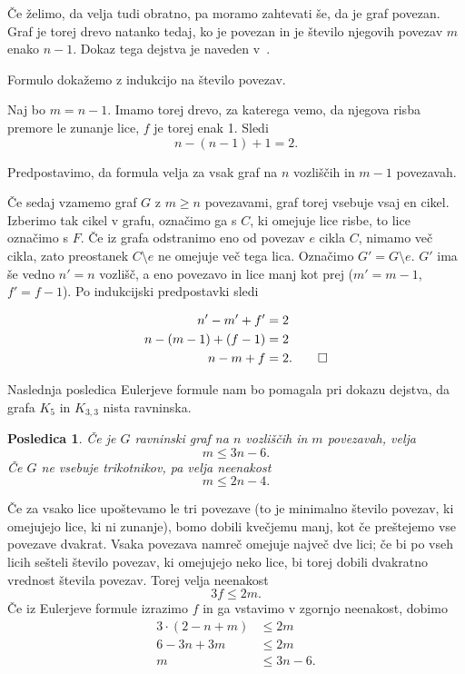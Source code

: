 \documentclass[12pt,a4paper]{amsart}
\theoremstyle{definition} %
\theoremstyle{plain} %
\newtheorem{posledica}[definicija]{Posledica}
\begin{document}
Če želimo, da velja tudi obratno, pa moramo zahtevati še, da je graf povezan. Graf je torej drevo natanko tedaj, ko je povezan in je število njegovih povezav $m$ enako $n-1$. Dokaz tega dejstva je naveden v~\cite[str.~57]{bib:potocnik}.

    Formulo dokažemo z indukcijo na število povezav.
    
    Naj bo $m = n-1$. Imamo torej drevo, za katerega vemo, da njegova risba premore le zunanje lice, $f$ je torej enak 1. Sledi
    \[ n - (n-1) + 1 = 2. \]
    
    Predpostavimo, da formula velja za vsak graf na $n$ vozliščih in $m-1$ povezavah.
    
    Če sedaj vzamemo graf $G$ z $m \geq n$ povezavami, graf torej vsebuje vsaj en cikel. Izberimo tak cikel v grafu, označimo ga s $C$, ki omejuje lice risbe, to lice označimo s $F$. Če iz grafa odstranimo eno od povezav $e$ cikla $C$, nimamo več cikla, zato preostanek $C \setminus e$ ne omejuje več tega lica. Označimo $G' = G \setminus e$. $G'$ ima še vedno $n'=n$ vozlišč, a eno povezavo in lice manj kot prej ($m'=m-1$, $f'=f-1$). Po indukcijski predpostavki sledi
    
    \begin{align*}
        n' - m' + f'      &= 2 \\
        n - (m-1) + (f-1) &= 2 \\
        n - m + f         &= 2. \qedhere
    \end{align*}
\endproof

Naslednja posledica Eulerjeve formule nam bo pomagala pri dokazu dejstva, da grafa $K_5$ in $K_{3,3}$ nista ravninska.

\begin{posledica}
    Če je $G$ ravninski graf na $n$ vozliščih in $m$ povezavah, velja
    \begin{equation} 
    \label{eq:posledica-euler-formula}
    m \leq 3n - 6.
    \end{equation}
    Če $G$ ne vsebuje trikotnikov, pa velja neenakost
    \begin{equation} 
    \label{eq:posledica-euler-formula-trik}
    m \leq 2n - 4.
    \end{equation}
\end{posledica}

\proof
    Če za vsako lice upoštevamo le tri povezave (to je minimalno število povezav, ki omejujejo lice, ki ni zunanje), bomo dobili kvečjemu manj, kot če preštejemo vse povezave dvakrat.
    Vsaka povezava namreč omejuje največ dve lici; če bi po vseh licih sešteli število povezav, ki omejujejo neko lice, bi torej dobili dvakratno vrednost števila povezav.
    Torej velja neenakost
    \[ 3f \leq 2m .\]
    Če iz Eulerjeve formule izrazimo $f$ in ga vstavimo v zgornjo neenakost, dobimo
    \begin{align*}
        3\cdot(2-n+m) &\leq 2m \\
        6 - 3n + 3m &\leq 2m \\
        m &\leq 3n - 6.
    \end{align*}
    
\end{document}
